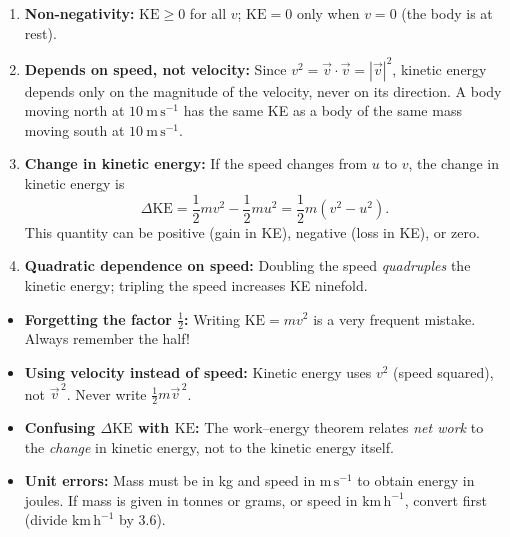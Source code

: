 \documentclass[11pt]{article}
\begin{document}
\begin{propriete}
\begin{enumerate}
\item \textbf{Non-negativity:} $\mathrm{KE} \ge 0$ for all $v$; $\mathrm{KE} = 0$ only when $v = 0$ (the body is at rest).
\item \textbf{Depends on speed, not velocity:} Since $v^2 = \vec{v}\cdot\vec{v} = |\vec{v}|^2$, kinetic energy depends only on the magnitude of the velocity, never on its direction. A body moving north at $10\ \mathrm{m\,s^{-1}}$ has the same KE as a body of the same mass moving south at $10\ \mathrm{m\,s^{-1}}$.
\item \textbf{Change in kinetic energy:} If the speed changes from $u$ to $v$, the change in kinetic energy is
\[
\Delta\mathrm{KE} = \frac{1}{2}mv^2 - \frac{1}{2}mu^2 = \frac{1}{2}m(v^2 - u^2).
\]
This quantity can be positive (gain in KE), negative (loss in KE), or zero.
\item \textbf{Quadratic dependence on speed:} Doubling the speed \emph{quadruples} the kinetic energy; tripling the speed increases KE ninefold.
\end{enumerate}
\end{propriete}

\begin{attention}
\begin{itemize}
\item \textbf{Forgetting the factor $\frac{1}{2}$:} Writing $\mathrm{KE} = mv^2$ is a very frequent mistake. Always remember the half!
\item \textbf{Using velocity instead of speed:} Kinetic energy uses $v^2$ (speed squared), not $\vec{v}^{\,2}$. Never write $\frac{1}{2}m\vec{v}^{\,2}$.
\item \textbf{Confusing $\Delta\mathrm{KE}$ with $\mathrm{KE}$:} The work–energy theorem relates \emph{net work} to the \emph{change} in kinetic energy, not to the kinetic energy itself.
\item \textbf{Unit errors:} Mass must be in kg and speed in $\mathrm{m\,s^{-1}}$ to obtain energy in joules. If mass is given in tonnes or grams, or speed in $\mathrm{km\,h^{-1}}$, convert first (divide $\mathrm{km\,h^{-1}}$ by $3.6$).
\end{itemize}
\end{attention}
\end{document}
